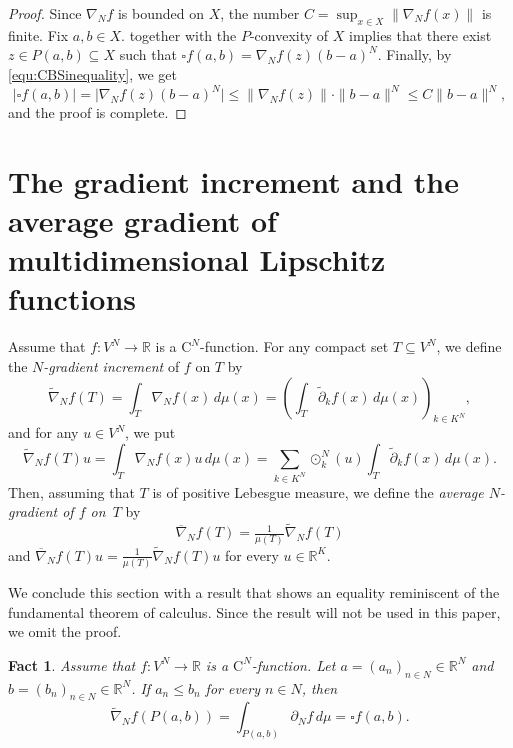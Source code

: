 \documentclass{amsart}
\theoremstyle{plain}%
\newtheorem{fact}[theorem]{Fact}
\theoremstyle{definition}
\theoremstyle{remark}
\begin{document}
\begin{proof}
Since $\nabla\!_Nf$ is bounded on $X$, the number $C=\sup_{x\in X}\big\|\nabla\!_Nf(x)\big\|$ is finite. Fix $a,b\in X$.
 together with the $P$\nobreakdash-convexity of $X$ implies that there exist $z\in P(a,b)\subseteq X$ such that
$\square f(a,b)=\nabla\!_Nf(z)(b-a)^N$. Finally, by \eqref{equ:CBSinequality}, we get
\begin{equation*}
\big|\square f(a,b)\big|
=\big|\nabla\!_Nf(z)(b-a)^N\big|
\le \big\|\nabla\!_Nf(z)\big\|
\cdot \|b-a\|^N
\le C\|b-a\|^N,
\end{equation*}
and the proof is complete.
\end{proof}
	

\section{The gradient increment and the average gradient of multidimensional Lipschitz functions}\label{section6}
Assume that $f\colon V^N\to\mathbb{R}$ is a $\mathrm{C}^N$\nobreakdash-function. For any compact set $T\subseteq V^N$, we define the \emph{$N$\nobreakdash-gradient increment} of $f$ on $T$ by 
\begin{equation*}
\widetilde{\nabla}\!_Nf(T)=\int_T \nabla\!_N f(x)\, d\mu(x)
=\left(\int_T \widetilde{\partial}_{k}f(x)\, d\mu(x)\right)_{k\in K^N},
\end{equation*}
and for any $u\in V^N$, we put
\begin{equation*}
\widetilde{\nabla}\!_Nf(T)u=\int_T \nabla\!_N f(x)u\,d\mu(x)
=\sum_{k\in K^N}\odot^N_k(u)\int_T\widetilde{\partial}_{k}f(x)\, d\mu(x).
\end{equation*}
Then, assuming that $T$ is of positive Lebesgue measure, we define the \emph{average $N$\nobreakdash-gradient of $f$ on~$T$} by 
\begin{equation*}
\overline{\nabla}\!_Nf(T)=\tfrac{1}{\mu(T)}\widetilde{\nabla}\!_Nf(T)
\end{equation*}
and $\overline{\nabla}\!_Nf(T)u=\tfrac{1}{\mu(T)}\widetilde{\nabla}\!_Nf(T)u$ for every $u\in\mathbb{R}^K$.

We conclude this section with a result that shows an equality reminiscent of the fundamental theorem of calculus. Since the result will not be used in this paper, we omit the proof.

\begin{fact}
Assume that $f\colon V^N\to\mathbb{R}$ is a $\mathrm{C}^N$\nobreakdash-function. Let $a=(a_n)_{n\in N}\in\mathbb{R}^N$ and $b=(b_n)_{n\in N}\in\mathbb{R}^N$. If $a_n\le b_n$ for every $n\in N$, then
\begin{equation*}
\widetilde{\nabla}_Nf(P(a,b))=\int_{P(a,b)}\partial_Nf\, d\mu=\square f(a,b).
\end{equation*}
\end{fact} 
\end{document}
